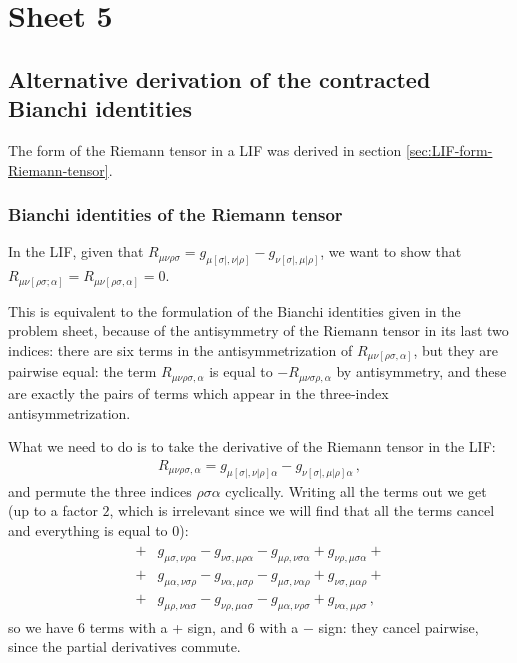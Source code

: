 \documentclass[main.tex]{subfiles}
\begin{document}
\section{Sheet 5}

\subsection{Alternative derivation of the contracted Bianchi identities}

The form of the Riemann tensor in a LIF was derived in section \ref{sec:LIF-form-Riemann-tensor}.

\subsubsection{Bianchi identities of the Riemann tensor}

In the LIF, given that \(  R_{\mu \nu \rho \sigma} = g_{\mu [\sigma |, \nu |\rho ]} - g_{\nu  [\sigma |, \mu | \rho ]} \), we want to show that \(R_{\mu \nu [\rho \sigma ; \alpha  ]} = R_{\mu \nu [\rho \sigma , \alpha ]} =0\).

This is equivalent to the formulation of the Bianchi identities given in the problem sheet, because of the antisymmetry of the Riemann tensor in its last two indices: there are six terms in the antisymmetrization of \(R_{\mu \nu [\rho \sigma , \alpha ]}\), but they are pairwise equal: the term \(R_{\mu \nu \rho \sigma , \alpha }\) is equal to \(- R_{\mu \nu \sigma \rho , \alpha }\) by antisymmetry, and these are exactly the pairs of terms which appear in the three-index antisymmetrization.

What we need to do is to take the derivative of the Riemann tensor in the LIF: 
%
\begin{align}
    R_{\mu \nu \rho \sigma , \alpha } = 
    g_{\mu [\sigma |, \nu |\rho ] \alpha } - g_{\nu  [\sigma |, \mu | \rho ] \alpha }
\,,
\end{align}
%
and permute the three indices \(\rho \sigma  \alpha \) cyclically. Writing all the terms out we get (up to a factor \(2\), which is irrelevant since we will find that all the terms cancel and everything is equal to 0):  
%
\begin{align}
    \begin{split}
        +&g_{\mu \sigma , \nu \rho \alpha } - g_{\nu  \sigma , \mu  \rho  \alpha }
        - g_{\mu \rho  , \nu \sigma \alpha } + g_{\nu  \rho  , \mu  \sigma  \alpha } + \\
        +&g_{\mu \alpha , \nu \sigma  \rho  } - g_{\nu  \alpha  , \mu  \sigma \rho  }
        - g_{\mu \sigma  , \nu \alpha \rho  } + g_{\nu  \sigma   , \mu  \alpha \rho  } + \\
        + &g_{\mu \rho  , \nu \alpha \sigma  } - g_{\nu  \rho  , \mu  \alpha \sigma  }
        - g_{\mu \alpha   , \nu \rho \sigma  } + g_{\nu  \alpha   , \mu \rho \sigma  } 
        \,,
    \end{split}
\end{align}
%
so we have \(6 \) terms with a + sign, and \(6\) with a \(-\) sign: they cancel pairwise, since the partial  derivatives commute.
\end{document}
